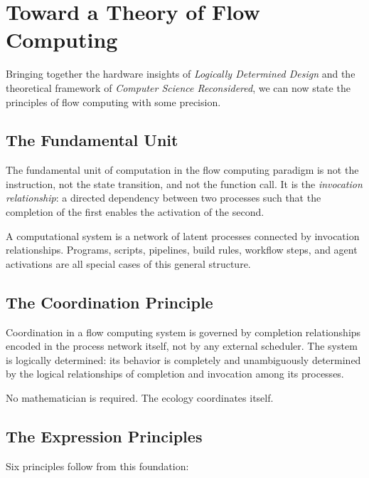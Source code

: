 \documentclass[12pt, a4paper]{article}
\begin{document}
\section{Toward a Theory of Flow Computing}

Bringing together the hardware insights of \textit{Logically
Determined Design} and the theoretical framework of
\textit{Computer Science Reconsidered}, we can now state the
principles of flow computing with some precision.

\subsection{The Fundamental Unit}

The fundamental unit of computation in the flow computing paradigm
is not the instruction, not the state transition, and not the
function call. It is the \emph{invocation relationship}: a directed
dependency between two processes such that the completion of the
first enables the activation of the second.

A computational system is a network of latent processes connected
by invocation relationships. Programs, scripts, pipelines, build
rules, workflow steps, and agent activations are all special cases
of this general structure.

\subsection{The Coordination Principle}

Coordination in a flow computing system is governed by completion
relationships encoded in the process network itself, not by any
external scheduler. The system is logically determined: its behavior
is completely and unambiguously determined by the logical
relationships of completion and invocation among its processes.

No mathematician is required. The ecology coordinates itself.

\subsection{The Expression Principles}

Six principles follow from this foundation:
\end{document}
